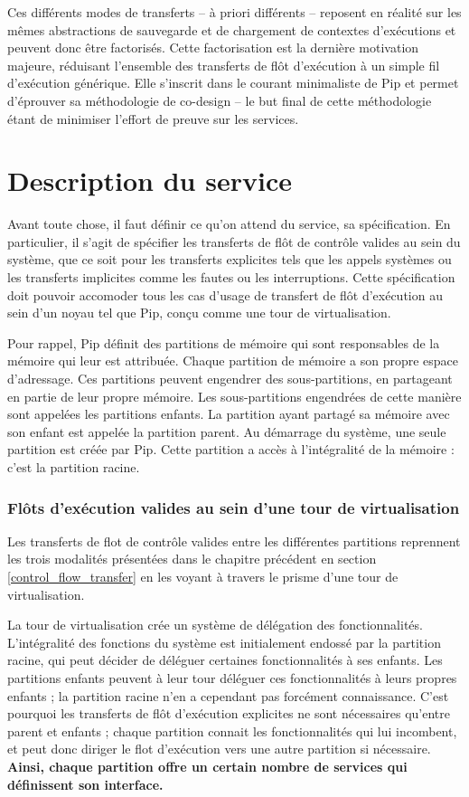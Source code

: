 		Ces différents modes de transferts -- à priori différents -- reposent en réalité sur les mêmes abstractions de sauvegarde et de chargement de contextes d'exécutions et peuvent donc être factorisés. Cette factorisation est la dernière motivation majeure, réduisant l'ensemble des transferts de flôt d'exécution à un simple fil d'exécution générique. Elle s'inscrit dans le courant minimaliste de Pip et permet d'éprouver sa méthodologie de co-design -- le but final de cette méthodologie étant de minimiser l'effort de preuve sur les services.

	\section{Description du service}

	Avant toute chose, il faut définir ce qu'on attend du service, sa spécification. En particulier, il s'agit de spécifier les transferts de flôt de contrôle valides au sein du système, que ce soit pour les transferts explicites tels que les appels systèmes ou les transferts implicites comme les fautes ou les interruptions. Cette spécification doit pouvoir accomoder tous les cas d'usage de transfert de flôt d'exécution au sein d'un noyau tel que Pip, conçu comme une tour de virtualisation.
	
	Pour rappel, Pip définit des partitions de mémoire qui sont responsables de la mémoire qui leur est attribuée. Chaque partition de mémoire a son propre espace d'adressage. Ces partitions peuvent engendrer des sous-partitions, en partageant en partie de leur propre mémoire. Les sous-partitions engendrées de cette manière sont appelées les partitions enfants. La partition ayant partagé sa mémoire avec son enfant est appelée la partition parent. Au démarrage du système, une seule partition est créée par Pip. Cette partition a accès à l'intégralité de la mémoire : c'est la partition racine.

	\subsubsection{Flôts d'exécution valides au sein d'une tour de virtualisation}

	Les transferts de flot de contrôle valides entre les différentes partitions reprennent les trois modalités présentées dans le chapitre précédent en section \ref{control_flow_transfer} en les voyant à travers le prisme d'une tour de virtualisation.

	La tour de virtualisation crée un système de délégation des fonctionnalités. L'intégralité des fonctions du système est initialement endossé par la partition racine, qui peut décider de déléguer certaines fonctionnalités à ses enfants. Les partitions enfants peuvent à leur tour déléguer ces fonctionnalités à leurs propres enfants ; la partition racine n'en a cependant pas forcément connaissance. C'est pourquoi les transferts de flôt d'exécution explicites ne sont nécessaires qu'entre parent et enfants ; chaque partition connait les fonctionnalités qui lui incombent, et peut donc diriger le flot d'exécution vers une autre partition si nécessaire. \textbf{Ainsi, chaque partition offre un certain nombre de services qui définissent son interface.}

